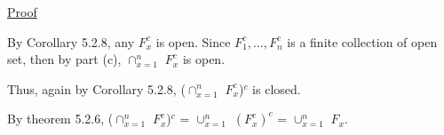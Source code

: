 \begin{enumerate}[label=(\alph*), leftmargin=2cm, itemsep=0.4em]
			{ \color{magenta} \underline{Proof} }

				By {\color{orange} Corollary 5.2.8}, any $F_x^c$ is open.
				Since $F_1^c, ... , F_n^c$ is a finite collection of
				open set, then by part (c), $\cap_{x=1}^n$ $F_x^c$ is open.

				Thus, again by {\color{orange} Corollary 5.2.8},
				($\cap_{x=1}^n$ $F_x^c$)$^c$ is closed.

				By {\color{red} theorem 5.2.6},
				($\cap_{x=1}^n$ $F_x^c$)$^c$ = $\cup_{x=1}^n$ $(F_x^c)^c$
				= $\cup_{x=1}^n$ $F_x$.
	\end{enumerate}



